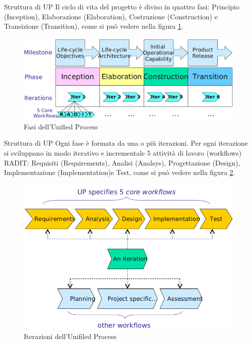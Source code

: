 \documentclass[t]{beamer} %
\begin{document}
 \begin{frame} {Struttura di UP}
    Il ciclo di vita del progetto è diviso in quattro fasi: Principio (Inception), Elaborazione (Elaboration), Costruzione (Construction)
    e Transizione (Transition), come si può vedere nella figura \ref{fig_US}. 
   \begin{figure}
     \includegraphics[scale=0.30]{image/Up_Structure.png}{\centering}
    \caption{Fasi dell'Unified Process} 
    \label{fig_US}
   \end{figure}
  \end{frame}

 \begin{frame} {Struttura di UP}
   Ogni fase è formata da una o più iterazioni. Per ogni iterazione si sviluppano in modo iterativo e incrementale 5 attività di lavoro 
   (workflows) RADIT: Requisiti (Requirements), Analisi (Analsys), Progettazione (Design), Implementazione (Implementation)e Test, come si 
   può vedere nella figura \ref{fig_UIW}.
   \begin{figure}
     \includegraphics[scale=0.20]{image/Up_Iteration_Workflows.png}{\centering}
    \caption{Iterazioni dell'Unifiled Process} 
    \label{fig_UIW}
   \end{figure}
  \end{frame}
\end{document}
